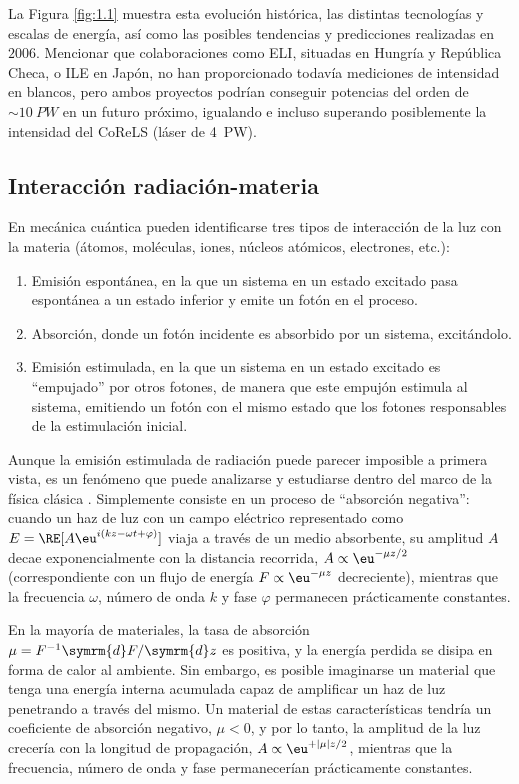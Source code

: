 La Figura \ref{fig:1.1} muestra esta evolución histórica, las distintas tecnologías y escalas de energía, así como las posibles tendencias y predicciones \autocite{Mourou2006} realizadas en $2006$. Mencionar que colaboraciones como ELI, situadas en Hungría y República Checa, o ILE en Japón, no han proporcionado todavía mediciones de intensidad en blancos, pero ambos proyectos podrían conseguir potencias del orden de $\sim \qty{10}{PW}$ en un futuro próximo, igualando e incluso superando posiblemente la intensidad del CoReLS (láser  de \qty{4}{PW}). 

\subsection{Interacción radiación-materia}\label{sec:1.1.1}
En mecánica cuántica pueden identificarse tres tipos de interacción de la luz con la materia (átomos, moléculas, iones, núcleos atómicos, electrones, etc.): 
\begin{enumerate}[label=(\roman*)]

    \item Emisión espontánea, en la que un sistema en un estado excitado pasa espontánea a un estado inferior y emite un fotón en el proceso.
    \item Absorción, donde un fotón incidente es absorbido por un sistema, excitándolo.
    \item Emisión estimulada, en la que un sistema en un estado excitado es \enquote{empujado} por otros fotones, de manera que este empujón estimula al sistema, emitiendo un fotón con el mismo estado que los fotones responsables de la estimulación inicial.

\end{enumerate}
Aunque la emisión estimulada de radiación puede parecer imposible a primera vista, es un fenómeno que puede analizarse y estudiarse dentro del marco de la física clásica \autocite{Thorne2017}. Simplemente consiste en un proceso de \enquote{absorción negativa}: cuando un haz de luz con un campo eléctrico representado como $E = \RE [A\eu^{i(kz - \omega t + \varphi)}]$ viaja a través de un medio absorbente, su amplitud $A$ decae exponencialmente con la distancia recorrida, $A \propto \eu^{-\mu z/2}$ (correspondiente con un flujo de energía $F \propto \eu^{-\mu z}$ decreciente), mientras que la frecuencia $\omega$, número de onda $k$ y fase $\varphi$ permanecen prácticamente constantes.

En la mayoría de materiales, la tasa de absorción $\mu = F^{-1} \symrm{d}F/\symrm{d}z$ es positiva, y la energía perdida se disipa en forma de calor al ambiente. Sin embargo, es posible imaginarse un material que tenga una energía interna acumulada capaz de amplificar un haz de luz penetrando a través del mismo. Un material de estas características tendría un coeficiente de absorción negativo, $\mu < 0$, y por lo tanto, la amplitud de la luz crecería con la longitud de propagación, $A \propto \eu^{+|\mu|z/2}$, mientras que la frecuencia, número de onda y fase permanecerían prácticamente constantes.

